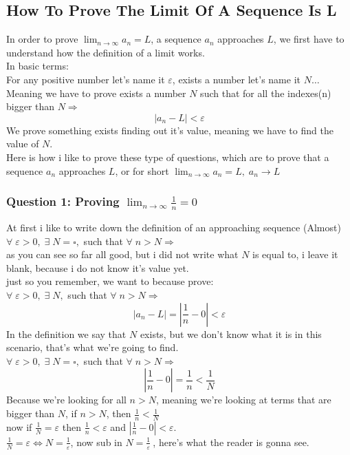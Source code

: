 \subsection{How To Prove The Limit Of A Sequence Is L}
In order to prove $\lim_{n\to \infty} a_n = L$, a sequence $a_n$ approaches $L$, we first have to understand how the definition of a limit works.\\
In basic terms:\\
For any positive number let's name it $\varepsilon$, exists a number let's name it $N\ldots$\\
Meaning we have to prove exists a number $N$ such that for all the indexes(n) bigger than $N\Longrightarrow$\\
\[
    |a_n-L|<\varepsilon
\]
We prove something exists finding out it's value, meaning we have to find the value of $N$.\\
Here is how i like to prove these type of questions, which are to prove that a sequence $a_n$ approaches $L$, or for short $\lim_{n\to\infty}a_n=L,\;a_n\rightarrow L$\\



\subsubsection{Question 1: Proving \(\lim_{n \to \infty} \frac{1}{n} = 0\)}
At first i like to write down the definition of an approaching sequence (Almost)\\
$\forall \; \varepsilon>0,\; \exists \; N = \square ,$ such that $\forall \; n>N \Longrightarrow$\\
as you can see so far all good, but i did not write what $N$ is equal to, i leave it blank, because i do not know it's value yet.\\
just so you remember, we want to  because prove:\\
$\forall \; \varepsilon>0, \; \exists\; N,$ such that $\forall \; n>N \Longrightarrow$
\[
    |a_n-L| = |\frac{1}{n}-0|<\varepsilon
\]
In the definition we say that $N$ exists, but we don't know what it is in this scenario, that's what we're going to find.\\
$\forall \; \varepsilon>0,\; \exists \; N = \square ,$ such that $\forall \; n>N \Longrightarrow$
\[
    |\frac{1}{n} - 0| = \frac{1}{n}<\frac{1}{N}
\]
Because we're looking for all $n>N$, meaning we're looking at terms that are bigger than $N$, if $n>N$, then $\frac{1}{n}<\frac{1}{N}$\\
now if $\frac{1}{N} = \varepsilon$ then $\frac{1}{n}<\varepsilon$ and $|\frac{1}{n}-0| <\varepsilon$.\\
$\frac{1}{N} = \varepsilon \iff N=\frac{1}{\varepsilon}$, now sub in $N = \frac{1}{\varepsilon}\:$, here's what the reader is gonna see.\\

